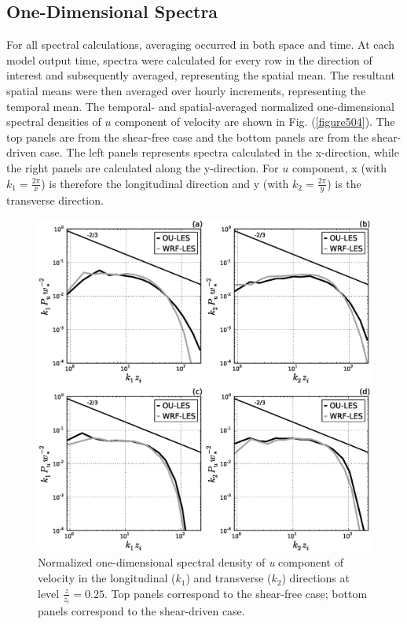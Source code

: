 \subsection{One-Dimensional Spectra}
\label{spec1d-532}

For all spectral calculations, averaging occurred in both space and time. At each model output time, spectra were calculated for every row in the direction of interest and subsequently averaged, representing the spatial mean. The resultant spatial means were then averaged over hourly increments, representing the temporal mean. The temporal- and spatial-averaged normalized one-dimensional spectral densities of $u$ component of velocity are shown in Fig. (\autoref{figure504}). The top panels are from the shear-free case and the bottom panels are from the shear-driven case. The left panels represents spectra calculated in the x-direction, while the right panels are calculated along the y-direction. For $u$ component, x (with $k_1 = \frac{2\pi}{x}$) is therefore the longitudinal direction and y (with $k_2 = \frac{2\pi}{y}$) is the transverse direction. 


\begin{figure}[!ht]
\begin{center}
\includegraphics[width=\textwidth]{figures/chapter5/spectra1D_u}
\end{center}
\caption{Normalized one-dimensional spectral density of \textit{u} component of velocity in the longitudinal ($k_1$) and transverse ($k_2$) directions at level $\frac{z}{z_i}=0.25$. Top panels correspond to the shear-free case; bottom panels correspond to the shear-driven case.}
\label{figure504}
\end{figure}


